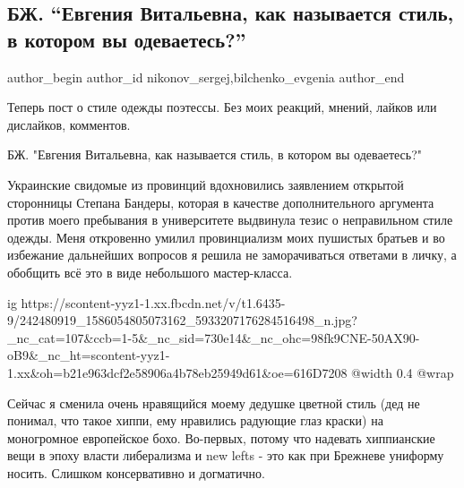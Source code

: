  
 
 
 
 
 
\subsection{БЖ. \enquote{Евгения Витальевна, как называется стиль, в котором вы одеваетесь?}}
\label{sec:21_09_2021.fb.nikonov_sergej.4.stil_odezhdy}
 
\ifcmt
 author_begin
   author_id nikonov_sergej,bilchenko_evgenia
 author_end
\fi

Теперь пост о стиле одежды поэтессы. Без моих реакций, мнений, лайков или
дислайков, комментов.

БЖ. "Евгения Витальевна, как называется стиль, в котором вы одеваетесь?"

Украинские свидомые из провинций вдохновились заявлением открытой сторонницы
Степана Бандеры, которая в качестве дополнительного аргумента против моего
пребывания в университете выдвинула тезис о неправильном стиле одежды. Меня
откровенно умилил провинциализм моих пушистых братьев и во избежание дальнейших
вопросов я решила не заморачиваться ответами в личку, а обобщить всё это в виде
небольшого мастер-класса.

\ifcmt
  ig https://scontent-yyz1-1.xx.fbcdn.net/v/t1.6435-9/242480919_1586054805073162_5933207176284516498_n.jpg?_nc_cat=107&ccb=1-5&_nc_sid=730e14&_nc_ohc=98fk9CNE-50AX90-oB9&_nc_ht=scontent-yyz1-1.xx&oh=b21e963dcf2e58906a4b78eb25949d61&oe=616D7208
  @width 0.4
  @wrap 
\fi

Сейчас я сменила очень нравящийся моему дедушке цветной стиль (дед не понимал,
что такое хиппи, ему нравились радующие глаз краски) на моногромное европейское
бохо. Во-первых, потому что надевать хиппианские вещи в эпоху власти
либерализма и new lefts - это как при Брежневе униформу носить. Слишком
консервативно и догматично.

